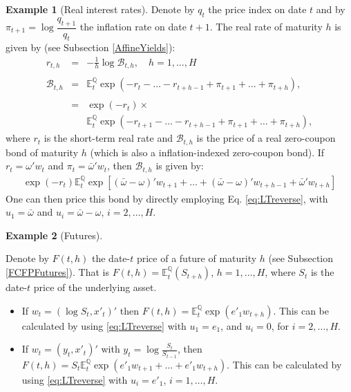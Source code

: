 \documentclass[
  12pt,
]{book}
\theoremstyle{definition}
\theoremstyle{definition}
\newtheorem{example}{Example}[chapter]
\theoremstyle{definition}
\theoremstyle{definition}
\theoremstyle{remark}
\begin{document}
\begin{example}[Real interest rates]
\protect\hypertarget{exm:realBth}{}\label{exm:realBth}Denote by \(q_t\) the price index on date \(t\) and by \(\pi_{t+1} = \log \dfrac{q_{t+1}}{q_t}\) the inflation rate on date \(t+1\). The real rate of maturity \(h\) is given by (see Subsection \ref{AffineYields}):
\begin{eqnarray*}
r_{t,h} & =& -   \frac{1}{h}   \log   \mathcal{B}_{t,h}, \quad h=1,\dots,H \\    \\
\mathcal{B}_{t,h} & =&  \mathbb{E}^{\mathbb{Q}}_t   \exp(-r_{t}-\dots-r_{t+h-1} + \pi_{t+1}+\dots+\pi_{t+h}),  \\      \\
& =& \exp(-r_{t}) \times \\
&& \mathbb{E}^{\mathbb{Q}}_t \exp(-r_{t+1}-\dots-r_{t+h-1}+\pi_{t+1}+\dots+\pi_{t+h}),
\end{eqnarray*}
where \(r_t\) is the short-term real rate and \(\mathcal{B}_{t,h}\) is the price of a real zero-coupon bond of maturity \(h\) (which is also a inflation-indexed zero-coupon bond).
If \(r_t = \omega'w_t\) and \(\pi_t = \bar\omega'w_t\), then \(\mathcal{B}_{t,h}\) is given by:
\begin{eqnarray*}
\exp(-r_{t}) \mathbb{E}^{\mathbb{Q}}_t \exp[(\bar\omega-\omega)'w_{t+1}+\dots+(\bar\omega-\omega)'w_{t+h-1}+\bar\omega'
w_{t+h}]
\end{eqnarray*}
One can then price this bond by directly employing Eq. \eqref{eq:LTreverse}, with \(u_1 = \bar\omega\) and \(u_i = \bar\omega-\omega\), \(i = 2,\dots, H\).
\end{example}

\begin{example}[Futures]
\protect\hypertarget{exm:Futures}{}\label{exm:Futures}

Denote by \(F(t,h)\) the date-\(t\) price of a future of maturity \(h\) (see Subsection \ref{FCFPFutures}). That is \(F(t,h) = \mathbb{E}^{\mathbb{Q}}_t (S_{t+h})\), \(h=1,\dots,H\), where \(S_t\) is the date-\(t\) price of the underlying asset.

\begin{itemize}
\item
  If \(w_t = (\log S_t, x'_t)'\) then \(F(t,h) = \mathbb{E}^{\mathbb{Q}}_t \exp(e'_1 w_{t+h})\). This can be calculated by using \eqref{eq:LTreverse} with \(u_1 = e_1\), and \(u_i = 0\), for \(i=2,\dots,H\).
\item
  If \(w_t = (y_t, x'_t)'\) with \(y_t = \log\frac{S_t}{S_{t-1}}\), then \(F(t,h) = S_t \mathbb{E}^{\mathbb{Q}}_t \exp(e'_1 w_{t+1}+\dots+e'_1 w_{t+h})\). This can be calculated by using \eqref{eq:LTreverse} with \(u_i = e'_1\), \(i=1,\dots,H\).
\end{itemize}

\end{example}
\end{document}
